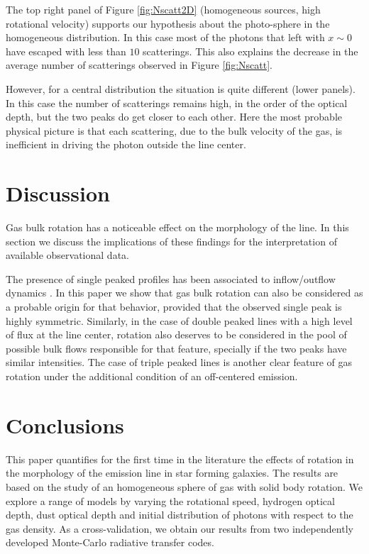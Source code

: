 \documentclass{emulateapj}
\newcommand{\ly}{{\ifmmode{{\rm Ly}\alpha~}\else{Ly$\alpha$~}\fi}}
\begin{document}
The top right panel of Figure \ref{fig:Nscatt2D} (homogeneous sources,
high rotational velocity) supports our hypothesis about
the photo-sphere in the homogeneous distribution. In this case most of
the photons that left with $x\sim 0$ have escaped with less than $10$
scatterings. This also explains the decrease in the average number of
scatterings observed in Figure \ref{fig:Nscatt}.

However, for a central distribution the situation is quite different
(lower panels). In this case the number of scatterings remains high,
in the order of the optical depth, but the two peaks do get closer to each
other. Here the most probable physical picture is that each
scattering, due to the bulk velocity of the gas, is inefficient in
driving the photon outside the line center.



\section{Discussion}
\label{sec:discussion}

Gas bulk rotation has a noticeable effect on the morphology of the
 \ly line. In this section we discuss the implications of these
 findings for the interpretation of available observational data.

The presence of single peaked profiles has been associated to
inflow/outflow dynamics \citep{Verhamme06,DijkstraKramer}. In this
paper we show that gas bulk rotation can also be considered as a
probable origin for that behavior, provided that the observed single peak is highly
symmetric. Similarly, in the case of double peaked lines with a high
level of flux at the line center, rotation also deserves to be considered in
the pool of possible bulk flows responsible for that feature,
specially if the two peaks have similar intensities. The case of
triple peaked lines is another clear feature of gas rotation under the
additional condition of an off-centered emission. 

\section{Conclusions}
\label{sec:conclusions}

This paper quantifies for the first time in the literature the effects
of rotation in the morphology of the \ly emission line in star forming
galaxies.  The results are based on the study of an homogeneous sphere
of gas with solid body rotation. We explore a range of models by varying
the rotational speed, hydrogen optical depth, dust optical depth and
initial distribution of \ly photons with respect to the gas
density. As a cross-validation, we obtain our results from two
independently developed Monte-Carlo radiative transfer codes. 
\end{document}
